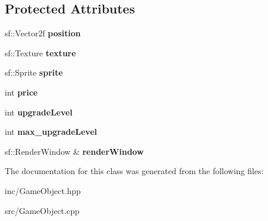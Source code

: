 \subsection*{Protected Attributes}
\begin{DoxyCompactItemize}
\item 
\hypertarget{class_game_object_a86e4253e3734436b4a5a0c503e0033b4}{sf\+::\+Vector2f {\bfseries position}}\label{class_game_object_a86e4253e3734436b4a5a0c503e0033b4}

\item 
\hypertarget{class_game_object_aca8660f812a0fd12180e0ffea73132ea}{sf\+::\+Texture {\bfseries texture}}\label{class_game_object_aca8660f812a0fd12180e0ffea73132ea}

\item 
\hypertarget{class_game_object_abb3608f1c76edd590e023585c2216f02}{sf\+::\+Sprite {\bfseries sprite}}\label{class_game_object_abb3608f1c76edd590e023585c2216f02}

\item 
\hypertarget{class_game_object_a88314fc76f1cf45645f8ff63babaf48e}{int {\bfseries price}}\label{class_game_object_a88314fc76f1cf45645f8ff63babaf48e}

\item 
\hypertarget{class_game_object_a165cf586ef996b80b7d7f824bc2562cd}{int {\bfseries upgrade\+Level}}\label{class_game_object_a165cf586ef996b80b7d7f824bc2562cd}

\item 
\hypertarget{class_game_object_ab0a5c75f7ba47ad079a2dee085ed51b7}{int {\bfseries max\+\_\+upgrade\+Level}}\label{class_game_object_ab0a5c75f7ba47ad079a2dee085ed51b7}

\item 
\hypertarget{class_game_object_a61cd92087627a1a6582d54740f24ea91}{sf\+::\+Render\+Window \& {\bfseries render\+Window}}\label{class_game_object_a61cd92087627a1a6582d54740f24ea91}

\end{DoxyCompactItemize}


The documentation for this class was generated from the following files\+:\begin{DoxyCompactItemize}
\item 
inc/Game\+Object.\+hpp\item 
src/Game\+Object.\+cpp\end{DoxyCompactItemize}
